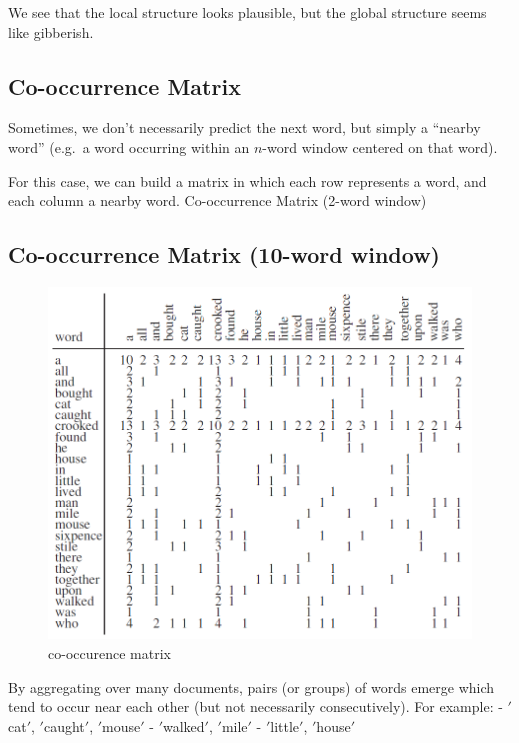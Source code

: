 \documentclass[11pt]{article}
\begin{document}
We see that the local structure looks plausible, but the global structure seems like gibberish.

\subsection{Co-occurrence Matrix}\label{subsec:co-occurrence-matrix}
Sometimes, we don’t necessarily predict the next word, but simply a “nearby word” (e.g.\ a word occurring within an $n$-word window centered on that word).

For this case, we can build a matrix in which each row represents a word, and each column a nearby word.
Co-occurrence Matrix (2-word window)

\subsection{Co-occurrence Matrix (10-word window)}\label{subsec:co-occurrence-matrix-(10-word-window)}
\begin{figure}[H]
    \centering
    \includegraphics{../out/images/co-occurence-matrix}
    \caption[co-occurence matrix]{co-occurence matrix}
    \label{fig:co-occurence matrix}
\end{figure}
By aggregating over many documents, pairs (or groups) of words emerge which tend to occur near each other (but not necessarily consecutively).
For example:
- \('\)cat\('\), \('\)caught\('\), \('\)mouse\('\)
- \('\)walked\('\), \('\)mile\('\)
- \('\)little\('\), \('\)house\('\)
\end{document}
